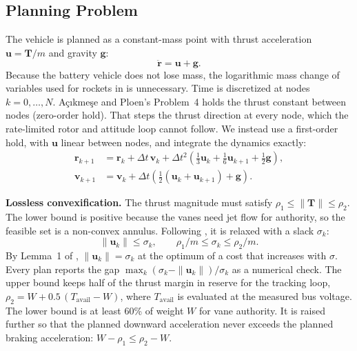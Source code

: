 \documentclass[conference]{IEEEtran}
\begin{document}
\subsection{Planning Problem}

The vehicle is planned as a constant-mass point with thrust acceleration $\mathbf{u} = \mathbf{T}/m$ and gravity $\mathbf{g}$:
\begin{equation}
\ddot{\mathbf{r}} = \mathbf{u} + \mathbf{g}.
\end{equation}
Because the battery vehicle does not lose mass, the logarithmic mass change of variables used for rockets in \cite{b21} is unnecessary. Time is discretized at nodes $k = 0,\dots,N$. A\c{c}{\i}kme\c{s}e and Ploen's Problem~4 holds the thrust constant between nodes (zero-order hold). That steps the thrust direction at every node, which the rate-limited rotor and attitude loop cannot follow. We instead use a first-order hold, with $\mathbf{u}$ linear between nodes, and integrate the dynamics exactly:
\begin{align}
\mathbf{r}_{k+1} &= \mathbf{r}_k + \Delta t\,\mathbf{v}_k + \Delta t^2\left(\tfrac{1}{3}\mathbf{u}_k + \tfrac{1}{6}\mathbf{u}_{k+1} + \tfrac{1}{2}\mathbf{g}\right), \label{eq:foh_r}\\
\mathbf{v}_{k+1} &= \mathbf{v}_k + \Delta t\left(\tfrac{1}{2}(\mathbf{u}_k + \mathbf{u}_{k+1}) + \mathbf{g}\right). \label{eq:foh_v}
\end{align}

\textbf{Lossless convexification.} The thrust magnitude must satisfy $\rho_1 \le \|\mathbf{T}\| \le \rho_2$. The lower bound is positive because the vanes need jet flow for authority, so the feasible set is a non-convex annulus. Following \cite{b21}, it is relaxed with a slack $\sigma_k$:
\begin{equation}
\|\mathbf{u}_k\| \le \sigma_k, \qquad \rho_1/m \le \sigma_k \le \rho_2/m .
\label{eq:lcvx}
\end{equation}
By Lemma~1 of \cite{b21}, $\|\mathbf{u}_k\| = \sigma_k$ at the optimum of a cost that increases with $\sigma$. Every plan reports the gap $\max_k(\sigma_k - \|\mathbf{u}_k\|)/\sigma_k$ as a numerical check. The upper bound keeps half of the thrust margin in reserve for the tracking loop, $\rho_2 = W + 0.5\,(T_{\text{avail}} - W)$, where $T_{\text{avail}}$ is evaluated at the measured bus voltage. The lower bound is at least 60\% of weight $W$ for vane authority. It is raised further so that the planned downward acceleration never exceeds the planned braking acceleration: $W - \rho_1 \le \rho_2 - W$.
\end{document}
